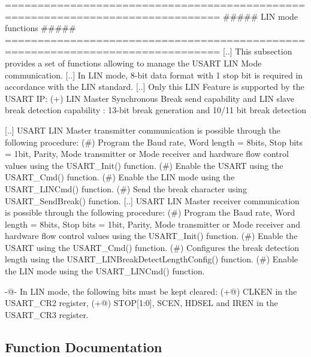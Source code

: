 \begin{DoxyVerb} ===============================================================================
                        ##### LIN mode functions #####
 ===============================================================================  
    [..]
    This subsection provides a set of functions allowing to manage the USART LIN 
    Mode communication.
    [..]
    In LIN mode, 8-bit data format with 1 stop bit is required in accordance with 
    the LIN standard.
    [..]
    Only this LIN Feature is supported by the USART IP:
      (+) LIN Master Synchronous Break send capability and LIN slave break detection
          capability :  13-bit break generation and 10/11 bit break detection

    [..]
    USART LIN Master transmitter communication is possible through the following 
    procedure:
      (#) Program the Baud rate, Word length = 8bits, Stop bits = 1bit, Parity, 
        Mode transmitter or Mode receiver and hardware flow control values using 
        the USART_Init() function.
      (#) Enable the USART using the USART_Cmd() function.
      (#) Enable the LIN mode using the USART_LINCmd() function.
      (#) Send the break character using USART_SendBreak() function.
    [..]
    USART LIN Master receiver communication is possible through the following procedure:
      (#) Program the Baud rate, Word length = 8bits, Stop bits = 1bit, Parity, 
          Mode transmitter or Mode receiver and hardware flow control values using 
          the USART_Init() function.
      (#) Enable the USART using the USART_Cmd() function.
      (#) Configures the break detection length using the USART_LINBreakDetectLengthConfig()
          function.
      (#) Enable the LIN mode using the USART_LINCmd() function.

      -@- In LIN mode, the following bits must be kept cleared:
       (+@) CLKEN in the USART_CR2 register,
       (+@) STOP[1:0], SCEN, HDSEL and IREN in the USART_CR3 register.\end{DoxyVerb}
 

\subsection{Function Documentation}
\mbox{\label{group___u_s_a_r_t___group4_ga7bc2d291831cbc5e53e73337308029b5}} 
